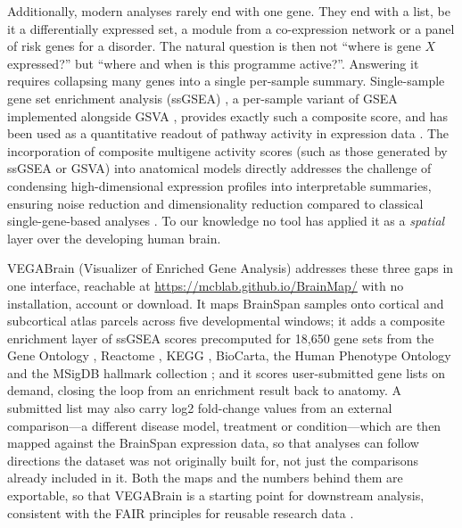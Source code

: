 \documentclass[pdflatex,sn-basic]{sn-jnl}
\begin{document}
Additionally, modern analyses rarely end
with one gene. They end with a list, be it a differentially expressed set, a module
from a co-expression network or a panel of risk genes for a disorder. The natural
question is then not ``where is gene $X$ expressed?'' but ``where and when is
this programme active?''. Answering it requires collapsing many genes
into a single per-sample summary. Single-sample gene set enrichment analysis
(ssGSEA) \citep{Barbie2009}, a per-sample variant of GSEA
\citep{Subramanian2005} implemented alongside GSVA \citep{Hanzelmann2013},
provides exactly such a composite score, and has been used as a quantitative
readout of pathway activity in expression data
\citep{Yi2020}. The incorporation of composite multigene activity scores (such as those generated by ssGSEA or GSVA) into anatomical models directly addresses the challenge of condensing high-dimensional expression profiles into interpretable summaries, ensuring noise reduction and dimensionality reduction compared to classical single-gene-based analyses \citep{Hanzelmann2013}. To our knowledge no tool has applied it as a
\emph{spatial} layer over the developing human brain.

VEGABrain (Visualizer of Enriched Gene Analysis) addresses these three gaps in
one interface, reachable at \url{https://mcblab.github.io/BrainMap/} with no
installation, account or download. It maps BrainSpan samples onto cortical and
subcortical atlas parcels across five developmental windows; it adds a composite
enrichment layer of ssGSEA scores precomputed for 18{,}650 gene sets from the
Gene Ontology \citep{Ashburner2000,GOConsortium2023}, Reactome
\citep{Gillespie2022}, KEGG \citep{Kanehisa2000}, BioCarta, the Human Phenotype
Ontology \citep{Kohler2021} and the MSigDB hallmark collection
\citep{Liberzon2011,Liberzon2015}; and it scores user-submitted gene lists on
demand, closing the loop from an enrichment result \citep{Chen2013,Kuleshov2016}
back to anatomy. A submitted list may also carry log2 fold-change values from an
external comparison---a different disease model, treatment or condition---which
are then mapped against the BrainSpan expression data, so that analyses can
follow directions the dataset was not originally built for, not just the
comparisons already included in it. Both the maps and the numbers behind them are exportable, so
that VEGABrain is a starting point for downstream analysis, 
consistent with the FAIR principles for reusable research data
\citep{Wilkinson2016}.

\end{document}
